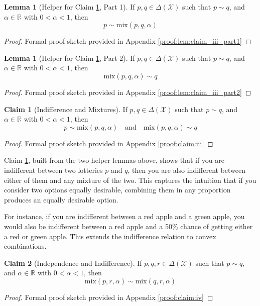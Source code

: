 \documentclass{article}
\theoremstyle{definition}
\newtheorem{lemma}[definition]{Lemma}
\newtheorem{claim}{Claim}[section] %
\newcommand{\R}{\mathbb{R}}
\newcommand{\X}{\mathcal{X}}
\newcommand{\DeltaX}{\Delta(\X)} %
\newcommand{\indiff}{\sim} %
\newcommand{\mix}{\mathrm{mix}} %
\begin{document}
\begin{lemma}[Helper for Claim \ref{claim:iii}, Part 1]\label{lem:claim_iii_part1}
If $p, q \in \DeltaX$ such that $p \indiff q$, and $\alpha \in \R$ with $0 < \alpha < 1$, then
\[ p \indiff \mix(p, q, \alpha) \]
\end{lemma}
\begin{proof}
Formal proof sketch provided in Appendix \ref{proof:lem:claim_iii_part1}
\end{proof}

\begin{lemma}[Helper for Claim \ref{claim:iii}, Part 2]\label{lem:claim_iii_part2}
If $p, q \in \DeltaX$ such that $p \indiff q$, and $\alpha \in \R$ with $0 < \alpha < 1$, then
\[ \mix(p, q, \alpha) \indiff q \]
\end{lemma}
\begin{proof}
Formal proof sketch provided in Appendix \ref{proof:lem:claim_iii_part2}
\end{proof}

\begin{claim}[Indifference and Mixtures]\label{claim:iii}
If $p, q \in \DeltaX$ such that $p \indiff q$, and $\alpha \in \R$ with $0 < \alpha < 1$, then
\[ p \indiff \mix(p, q, \alpha) \quad \text{and} \quad \mix(p, q, \alpha) \indiff q \]
\end{claim}
\begin{proof}
Formal proof sketch provided in Appendix \ref{proof:claim:iii}
\end{proof}

Claim \ref{claim:iii}, built from the two helper lemmas above, shows that if you are indifferent between two lotteries $p$ and $q$, then you are also indifferent between either of them and any mixture of the two. This captures the intuition that if you consider two options equally desirable, combining them in any proportion produces an equally desirable option.

For instance, if you are indifferent between a red apple and a green apple, you would also be indifferent between a red apple and a 50\% chance of getting either a red or green apple. This extends the indifference relation to convex combinations.

\begin{claim}[Independence and Indifference]\label{claim:iv}
If $p, q, r \in \DeltaX$ such that $p \indiff q$, and $\alpha \in \R$ with $0 < \alpha < 1$, then
\[ \mix(p, r, \alpha) \indiff \mix(q, r, \alpha) \]
\end{claim}
\begin{proof}
Formal proof sketch provided in Appendix \ref{proof:claim:iv}
\end{proof}
\end{document}
